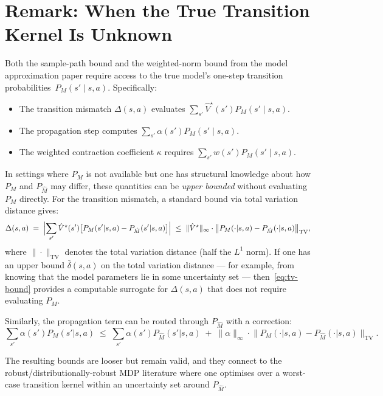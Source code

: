 \documentclass[11pt]{article}
\newcommand{\Vhatstar}{\hat V^\star}
\begin{document}
\section{Remark: When the True Transition Kernel Is Unknown}

Both the sample-path bound and the weighted-norm bound from the model
approximation paper require access to the true model's one-step transition
probabilities~$P_M(s' \mid s, a)$.  Specifically:
\begin{itemize}
  \item The transition mismatch $\Delta(s,a)$ evaluates
        $\sum_{s'} \Vhatstar(s') P_M(s' \mid s, a)$.
  \item The propagation step computes
        $\sum_{s'} \alpha(s') P_M(s' \mid s, a)$.
  \item The weighted contraction coefficient $\kappa$ requires
        $\sum_{s'} w(s') P_M(s' \mid s, a)$.
\end{itemize}

In settings where $P_M$ is not available but one has structural knowledge
about how $P_M$ and $P_{\hat M}$ may differ, these quantities can be
\emph{upper bounded} without evaluating $P_M$ directly.  For the transition
mismatch, a standard bound via total variation distance gives:
\begin{equation}\label{eq:tv-bound}
  \Delta(s,a)
  \;=\; \Bigl|\sum_{s'} \Vhatstar(s')\bigl[P_M(s'|s,a) - P_{\hat M}(s'|s,a)\bigr]\Bigr|
  \;\le\; \|\Vhatstar\|_\infty \cdot
          \bigl\|P_M(\cdot|s,a) - P_{\hat M}(\cdot|s,a)\bigr\|_{\mathrm{TV}},
\end{equation}
where $\|\cdot\|_{\mathrm{TV}}$ denotes the total variation distance (half the
$L^1$ norm).  If one has an upper bound $\bar\delta(s,a)$ on the total
variation distance --- for example, from knowing that the model parameters lie
in some uncertainty set --- then~\eqref{eq:tv-bound} provides a computable
surrogate for $\Delta(s,a)$ that does not require evaluating $P_M$.

Similarly, the propagation term can be routed through $P_{\hat M}$ with a
correction:
\[
  \sum_{s'} \alpha(s') P_M(s'|s,a)
  \;\le\; \sum_{s'} \alpha(s') P_{\hat M}(s'|s,a)
  \;+\; \|\alpha\|_\infty \cdot
        \bigl\|P_M(\cdot|s,a) - P_{\hat M}(\cdot|s,a)\bigr\|_{\mathrm{TV}}.
\]

The resulting bounds are looser but remain valid, and they connect to the
robust/distributionally-robust MDP literature where one optimises over a
worst-case transition kernel within an uncertainty set around $P_{\hat M}$.
\end{document}
